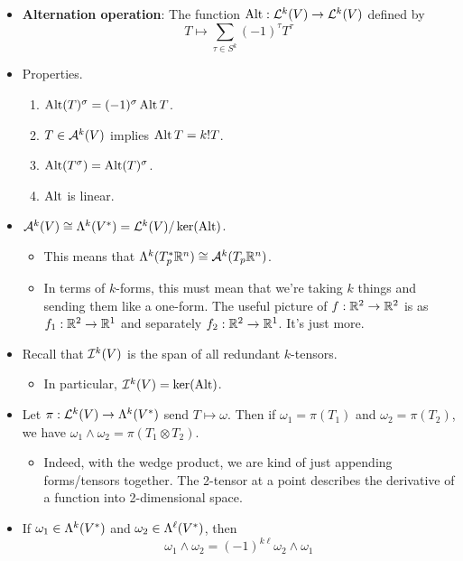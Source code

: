 \documentclass[../notes.tex]{subfiles}
\begin{document}
\begin{itemize}
    \item \textbf{Alternation operation}: The function $\Alt:\lin[k]{V}\to\lin[k]{V}$ defined by
    \begin{equation*}
        T \mapsto \sum_{\tau\in S^k}(-1)^\tau T^\tau
    \end{equation*}
    \item Properties.
    \begin{enumerate}
        \item $\Alt(T)^\sigma=(-1)^\sigma\Alt T$.
        \item $T\in\alt[k]{V}$ implies $\Alt T=k!T$.
        \item $\Alt(T^\sigma)=\Alt(T)^\sigma$.
        \item $\Alt$ is linear.
    \end{enumerate}
    \item $\alt[k]{V}\cong\lam[k]{V^*}=\lin[k]{V}/\ker(\Alt)$.
    \begin{itemize}
        \item This means that $\lam[k]{T_p^*\R^n}\cong\alt[k]{T_p\R^n}$.
        \item In terms of $k$-forms, this must mean that we're taking $k$ things and sending them like a one-form. The useful picture of $f:\R^2\to\R^2$ is as $f_1:\R^2\to\R^1$ and separately $f_2:\R^2\to\R^1$. It's just more.
    \end{itemize}
    \item Recall that $\ide[k]{V}$ is the span of all redundant $k$-tensors.
    \begin{itemize}
        \item In particular, $\ide[k]{V}=\ker(\Alt)$.
    \end{itemize}
    \item Let $\pi:\lin[k]{V}\to\lam[k]{V^*}$ send $T\mapsto\omega$. Then if $\omega_1=\pi(T_1)$ and $\omega_2=\pi(T_2)$, we have $\omega_1\wedge\omega_2=\pi(T_1\otimes T_2)$.
    \begin{itemize}
        \item Indeed, with the wedge product, we are kind of just appending forms/tensors together. The 2-tensor at a point describes the derivative of a function into 2-dimensional space.
    \end{itemize}
    \item If $\omega_1\in\lam[k]{V^*}$ and $\omega_2\in\lam[\ell]{V^*}$, then
    \begin{equation*}
        \omega_1\wedge\omega_2 = (-1)^{k\ell}\omega_2\wedge\omega_1
    \end{equation*}

\end{itemize}
\end{document}
